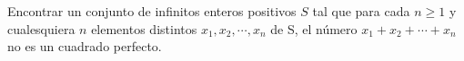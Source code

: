 Encontrar un conjunto de infinitos enteros positivos $ S$ tal que para cada $ n\ge 1$ y cualesquiera $ n$ elementos distintos $ x_1,x_2,\cdots, x_n$ de S, el número $ x_1 + x_2 + \cdots + x_n$ no es un cuadrado perfecto.

